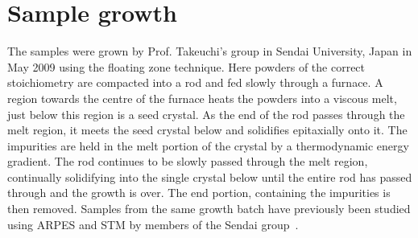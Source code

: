 
\section{Sample growth}

The samples were grown by Prof. Takeuchi's group in Sendai University, Japan in May 2009 using the floating zone technique. Here powders of the correct stoichiometry are compacted into a rod and fed slowly through a furnace. A region towards the centre of the furnace heats the powders into a viscous melt, just below this region is a seed crystal. As the end of the rod passes through the melt region, it meets the seed crystal below and solidifies epitaxially onto it. The impurities are held in the melt portion of the crystal by a thermodynamic energy gradient. The rod continues to be slowly passed through the melt region, continually solidifying into the single crystal below until the entire rod has passed through and the growth is over. The end portion, containing the impurities is then removed. Samples from the same growth batch have previously been studied using \ac{ARPES} and \ac{STM} by members of the Sendai group~\cite{Wise2009, Wise2008, Kondo2007, Kondo2005, Kondo2010, Kondo2009, Kondo2006, Kondo2007}.

